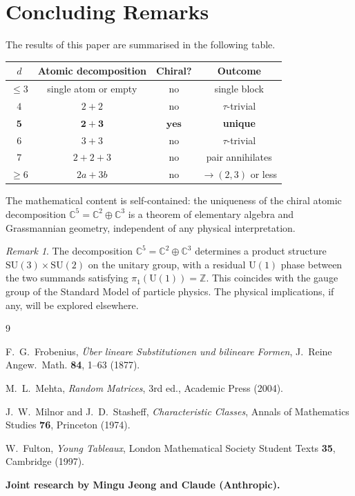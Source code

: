 \documentclass[12pt]{amsart}
\theoremstyle{definition}
\theoremstyle{remark}
\newtheorem{remark}[theorem]{Remark}
\newcommand{\CC}{\mathbb{C}}
\newcommand{\ZZ}{\mathbb{Z}}
\begin{document}
\section{Concluding Remarks}
\label{sec:conclusion}

The results of this paper are summarised in
the following table.

\begin{center}
\begin{tabular}{cccc}
\toprule
$d$ & Atomic decomposition & Chiral? & Outcome \\
\midrule
$\le 3$ & single atom or empty & no & single block \\
$4$ & $2 + 2$ & no & $\tau$-trivial \\
$\mathbf{5}$ & $\mathbf{2 + 3}$
  & $\mathbf{yes}$ & \textbf{unique} \\
$6$ & $3 + 3$ & no & $\tau$-trivial \\
$7$ & $2 + 2 + 3$ & no & pair annihilates \\
$\ge 6$ & $2a + 3b$ & no & $\to (2,3)$ or less \\
\bottomrule
\end{tabular}
\end{center}

The mathematical content is self-contained:
the uniqueness of the chiral atomic
decomposition $\CC^5 = \CC^2 \oplus \CC^3$
is a theorem of elementary algebra and
Grassmannian geometry,
independent of any physical interpretation.

\begin{remark}
The decomposition $\CC^5 = \CC^2 \oplus \CC^3$
determines a product structure
$\mathrm{SU}(3) \times \mathrm{SU}(2)$
on the unitary group, with a residual
$\mathrm{U}(1)$ phase between the two summands
satisfying $\pi_1(\mathrm{U}(1)) = \ZZ$.
This coincides with the gauge group of the
Standard Model of particle physics.
The physical implications, if any,
will be explored elsewhere.
\end{remark}

\begin{thebibliography}{9}

F.~G.~Frobenius,
\emph{\"Uber lineare Substitutionen und
bilineare Formen},
J.~Reine Angew.~Math. \textbf{84}, 1--63 (1877).

M.~L.~Mehta,
\emph{Random Matrices}, 3rd ed.,
Academic Press (2004).

J.~W.~Milnor and J.~D.~Stasheff,
\emph{Characteristic Classes},
Annals of Mathematics Studies \textbf{76},
Princeton (1974).

W.~Fulton,
\emph{Young Tableaux},
London Mathematical Society Student Texts
\textbf{35}, Cambridge (1997).

\end{thebibliography}

\bigskip
\noindent\textbf{Joint research by Mingu Jeong
and Claude (Anthropic).}
\end{document}
